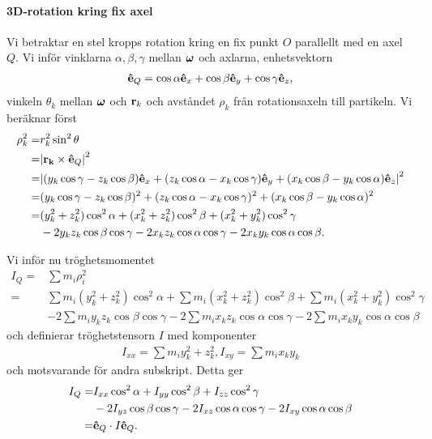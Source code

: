 \paragraph{3D-rotation kring fix axel}
Vi betraktar en stel kropps rotation kring en fix punkt $O$ parallellt med en axel $Q$. Vi inför vinklarna $\alpha, \beta, \gamma$ mellan $\vb*{\omega}$ och axlarna, enhetsvektorn
\begin{align*}
	\vu{e}_{Q} = \cos{\alpha}\vu{e}_{x} + \cos{\beta}\vu{e}_{y} + \cos{\gamma}\vu{e}_{z},
\end{align*}
vinkeln $\theta_k$ mellan $\vb*{\omega}$ och $\vb{r}_{k}$ och avståndet $\rho_{k}$ från rotationsaxeln till partikeln. Vi beräknar först
\begin{align*}
	\rho_{k}^2 =& r_{k}^2\sin^{2}{\theta} \\
	           =& \abs{\vb{r_{k}}\times\vu{e}_{Q}}^2 \\
	           =& \abs{(y_{k}\cos{\gamma} - z_{k}\cos{\beta})\vu{e}_{x} + (z_{k}\cos{\alpha} - x_{k}\cos{\gamma})\vu{e}_{y} + (x_{k}\cos{\beta} - y_{k}\cos{\alpha})\vu{e}_{z}}^2 \\
	           =& (y_{k}\cos{\gamma} - z_{k}\cos{\beta})^2 + (z_{k}\cos{\alpha} - x_{k}\cos{\gamma})^2 + (x_{k}\cos{\beta} - y_{k}\cos{\alpha})^2 \\
	           =& (y_{k}^2 + z_{k}^2)\cos^{2}{\alpha} + (x_{k}^2 + z_{k}^2)\cos^{2}{\beta} + (x_{k}^2 + y_{k}^2)\cos^{2}{\gamma} \\
	            &- 2y_{k}z_{k}\cos{\beta}\cos{\gamma} - 2x_{k}z_{k}\cos{\alpha}\cos{\gamma} - 2x_{k}y_{k}\cos{\alpha}\cos{\beta}.
\end{align*}

Vi inför nu tröghetsmomentet
\begin{align*}
	I_{Q} =& \sum m_{i}\rho_{i}^2 \\
	      =& \sum m_{i}(y_{k}^2 + z_{k}^2)\cos^{2}{\alpha} + \sum m_{i}(x_{k}^2 + z_{k}^2)\cos^{2}{\beta} + \sum m_{i}(x_{k}^2 + y_{k}^2)\cos^{2}{\gamma} \\
	       &- 2\sum m_{i}y_{k}z_{k}\cos{\beta}\cos{\gamma} - 2\sum m_{i}x_{k}z_{k}\cos{\alpha}\cos{\gamma} - 2\sum m_{i}x_{k}y_{k}\cos{\alpha}\cos{\beta}
\end{align*}
och definierar tröghetstensorn $I$ med komponenter
\begin{align*}
	I_{xx} = \sum m_{i}y_{k}^2 + z_{k}^2, I _{xy} =\sum m_{i}x_{k}y_{k} 
\end{align*}
och motsvarande för andra subskript. Detta ger
\begin{align*}
	I_{Q} =& I_{xx}\cos^{2}{\alpha} + I_{yy}\cos^{2}{\beta} + I_{zz}\cos^{2}{\gamma} \\
	       &- 2I_{yz}\cos{\beta}\cos{\gamma} - 2I_{xz}\cos{\alpha}\cos{\gamma} - 2I_{xy}\cos{\alpha}\cos{\beta} \\
	      =& \vu{e}_{Q}\cdot I\vu{e}_{Q}.
\end{align*}